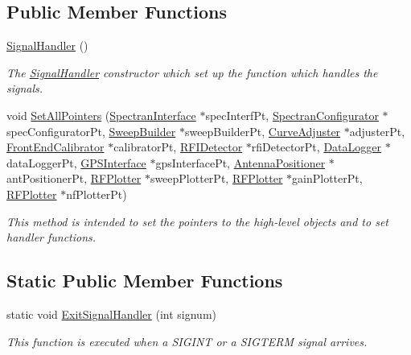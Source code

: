 \subsection*{Public Member Functions}
\begin{DoxyCompactItemize}
\item 
\mbox{\label{classSignalHandler_a3149ab1b5e1c8940d11b182f8059d916}} 
\hyperlink{classSignalHandler_a3149ab1b5e1c8940d11b182f8059d916}{Signal\+Handler} ()
\begin{DoxyCompactList}\small\item\em The \hyperlink{classSignalHandler}{Signal\+Handler} constructor which set up the function which handles the signals. \end{DoxyCompactList}\item 
\mbox{\label{classSignalHandler_a2151d93e15108f311501da2d3320fe5c}} 
void \hyperlink{classSignalHandler_a2151d93e15108f311501da2d3320fe5c}{Set\+All\+Pointers} (\hyperlink{classSpectranInterface}{Spectran\+Interface} $\ast$spec\+Interf\+Pt, \hyperlink{classSpectranConfigurator}{Spectran\+Configurator} $\ast$spec\+Configurator\+Pt, \hyperlink{classSweepBuilder}{Sweep\+Builder} $\ast$sweep\+Builder\+Pt, \hyperlink{classCurveAdjuster}{Curve\+Adjuster} $\ast$adjuster\+Pt, \hyperlink{classFrontEndCalibrator}{Front\+End\+Calibrator} $\ast$calibrator\+Pt, \hyperlink{classRFIDetector}{R\+F\+I\+Detector} $\ast$rfi\+Detector\+Pt, \hyperlink{classDataLogger}{Data\+Logger} $\ast$data\+Logger\+Pt, \hyperlink{classGPSInterface}{G\+P\+S\+Interface} $\ast$gps\+Interface\+Pt, \hyperlink{classAntennaPositioner}{Antenna\+Positioner} $\ast$ant\+Positioner\+Pt, \hyperlink{classRFPlotter}{R\+F\+Plotter} $\ast$sweep\+Plotter\+Pt, \hyperlink{classRFPlotter}{R\+F\+Plotter} $\ast$gain\+Plotter\+Pt, \hyperlink{classRFPlotter}{R\+F\+Plotter} $\ast$nf\+Plotter\+Pt)
\begin{DoxyCompactList}\small\item\em This method is intended to set the pointers to the high-\/level objects and to set handler functions. \end{DoxyCompactList}\end{DoxyCompactItemize}
\subsection*{Static Public Member Functions}
\begin{DoxyCompactItemize}
\item 
static void \hyperlink{classSignalHandler_af32b7213b43fd13fa12587a0c0d9b565}{Exit\+Signal\+Handler} (int signum)
\begin{DoxyCompactList}\small\item\em This function is executed when a S\+I\+G\+I\+NT or a S\+I\+G\+T\+E\+RM signal arrives. \end{DoxyCompactList}\end{DoxyCompactItemize}
